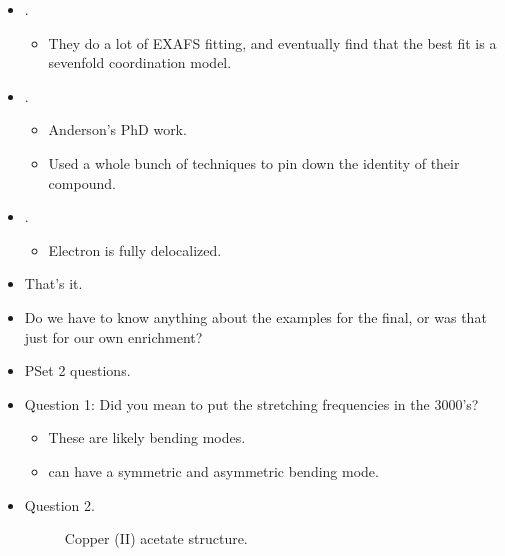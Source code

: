 \documentclass[../notes.tex]{subfiles}
\begin{document}
\begin{itemize}
\begin{itemize}
        \item First up: UV-Vis. One of the hallmarks is green color, and Rittle found this and was very excited.
        \item Mossbauer: At \SI{4}{\kelvin}, you get magnetic splitting.
        \item EPR: Gives more info on where an electron is in an enzymatic environment.
    \end{itemize}
    \item \textcite{bib:Coord7EXAFS}.
    \begin{itemize}
        \item They do a lot of EXAFS fitting, and eventually find that the best fit is a sevenfold coordination model.
    \end{itemize}
    \item \textcite{bib:AndersonPhD}.
    \begin{itemize}
        \item Anderson's PhD work.
        \item Used a whole bunch of techniques to pin down the identity of their compound.
    \end{itemize}
    \item \textcite{bib:EDelocal}.
    \begin{itemize}
        \item Electron is fully delocalized.
    \end{itemize}
    \item That's it.
    \item Do we have to know anything about the examples for the final, or was that just for our own enrichment?
    \item PSet 2 questions.
    \item Question 1: Did you mean to put the  stretching frequencies in the 3000's?
    \begin{itemize}
        \item These are likely bending modes.
        \item {} can have a symmetric and asymmetric bending mode.
    \end{itemize}
    \item Question 2.
    \begin{figure}[h!]
        \centering
        \footnotesize
        \caption{Copper (II) acetate structure.}
        \label{fig:CuOAcStruct}
    \end{figure}

\end{itemize}
\end{document}
